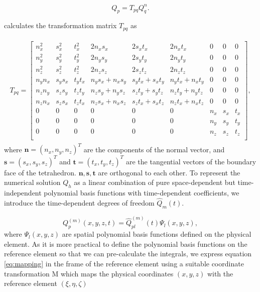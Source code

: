 \begin{equation}
    Q_p = T_{pq}Q_q^n .
\end{equation}

\parencite{dumbser1} calculates the transformation matrix $T_{pq}$ as

\begin{align}
    \begin{split}
    T_{pq} = 
        \begin{bmatrix}
        n_x^2 & s_x^2 & t_x^2 & 2n_x s_x & 2s_x t_x & 2n_x t_x & 0 & 0 & 0 \\
        n_y^2 & s_y^2 & t_y^2 & 2n_y s_y & 2s_y t_y & 2n_y t_y & 0 & 0 & 0 \\
        n_z^2 & s_z^2 & t_z^2 & 2n_z s_z & 2s_z t_z & 2n_z t_z & 0 & 0 & 0 \\
        n_y n_x & s_y s_x & t_y t_x & n_y s_x + n_x s_y & s_y t_x + s_x t_y & n_y t_x + n_x t_y & 0 & 0 & 0 \\
        n_z n_y & s_z s_y & t_z t_y & n_z s_y + n_y s_z & s_z t_y + s_y t_z & n_z t_y + n_y t_z & 0 & 0 & 0 \\
        n_z n_x & s_z s_x & t_z t_x & n_z s_x + n_x s_z & s_z t_x + s_x t_z & n_z t_x + n_x t_z & 0 & 0 & 0 \\
        0 & 0 & 0 & 0 & 0 & 0 & n_x & s_x & t_x \\
        0 & 0 & 0 & 0 & 0 & 0 & n_y & s_y & t_y \\
        0 & 0 & 0 & 0 & 0 & 0 & n_z & s_z & t_z \\
    \end{bmatrix},
    \end{split}
\end{align}
where $\mathbf{n} = \left(n_x, n_y, n_z\right)^T$ are the components of the normal vector, and $\mathbf{s} = \left(s_x, s_y, s_z\right)^T$ and
$\mathbf{t} = \left(t_x, t_y, t_z\right)^T$ are the tangential vectors of the boundary face of the tetrahedron. $\mathbf{n}, \mathbf{s}, \mathbf{t}$
are orthogonal to each other. To represent the numerical solution $Q_h$ as a linear combination of pure space-dependent but time-independent polynomial basis
functions with time-dependent coefficients, we introduce the time-dependent degrees of freedom $\hat{Q}_m\left(t\right)$.

\begin{equation}
    Q_p^{\left(m\right)} \left(x,y,z,t\right) = \hat{Q}_{pl}^{\left(m\right)} \left(t\right) \Psi_l \left(x, y, z\right),
    \label{eq:mapping}
\end{equation}
where $\Psi_l\left(x,y,z\right)$ are spatial polynomial basis functions defined on the physical element. As it is more practical to define the polynomial 
basis functions on the reference element so that we can pre-calculate the integrals, we express equation \ref{eq:mapping} in 
the frame of the reference element using a suitable coordinate transformation M which maps the physical coordinates $\left(x, y, z\right)$ with the reference element $\left(\xi, \eta, \zeta\right)$

